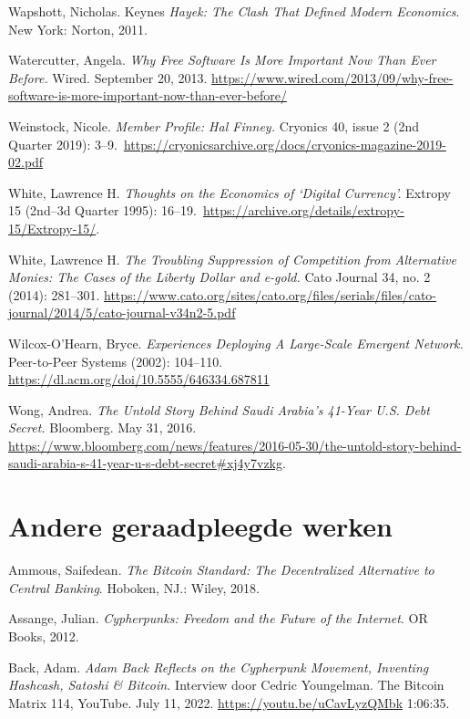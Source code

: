 \documentclass[
  a5paper,
  smalldemyvopaper,11pt,twoside,onecolumn,openright,extrafontsizes,
hidelinks]{memoir}
\begin{document}
Wapshott, Nicholas. Keynes \emph{Hayek: The Clash That Defined Modern
Economics}. New York: Norton, 2011.

Watercutter, Angela. \emph{Why Free Software Is More Important Now Than
Ever Before.} Wired. September 20, 2013.
\url{https://www.wired.com/2013/09/why-free-software-is-more-important-now-than-ever-before/}

Weinstock, Nicole. \emph{Member Profile: Hal Finney.} Cryonics 40, issue
2 (2nd Quarter 2019):
3--9.~\url{https://cryonicsarchive.org/docs/cryonics-magazine-2019-02.pdf}

White, Lawrence H. \emph{Thoughts on the Economics of `Digital
Currency'.} Extropy 15 (2nd--3d Quarter 1995):
16--19.~\url{https://archive.org/details/extropy-15/Extropy-15/}.

White, Lawrence H. \emph{The Troubling Suppression of Competition from
Alternative Monies: The Cases of the Liberty Dollar and e-gold.} Cato
Journal 34, no. 2 (2014): 281--301.
\url{https://www.cato.org/sites/cato.org/files/serials/files/cato-journal/2014/5/cato-journal-v34n2-5.pdf}

Wilcox-O'Hearn, Bryce. \emph{Experiences Deploying A Large-Scale
Emergent Network.} Peer-to-Peer Systems (2002): 104--110.
\url{https://dl.acm.org/doi/10.5555/646334.687811}

Wong, Andrea. \emph{The Untold Story Behind Saudi Arabia's 41-Year U.S.
Debt Secret.} Bloomberg. May 31, 2016.
\url{https://www.bloomberg.com/news/features/2016-05-30/the-untold-story-behind-saudi-arabia-s-41-year-u-s-debt-secret\#xj4y7vzkg}.

\section*{Andere geraadpleegde
werken}\label{andere-geraadpleegde-werken}


Ammous, Saifedean. \emph{The Bitcoin Standard: The Decentralized
Alternative to Central Banking}. Hoboken, NJ.: Wiley, 2018.

Assange, Julian. \emph{Cypherpunks: Freedom and the Future of the
Internet}. OR Books, 2012.

Back, Adam. \emph{Adam Back Reflects on the Cypherpunk Movement,
Inventing Hashcash, Satoshi \& Bitcoin.} Interview door Cedric
Youngelman. The Bitcoin Matrix 114, YouTube. July 11, 2022.
\url{https://youtu.be/uCavLyzQMbk} 1:06:35.
\end{document}
